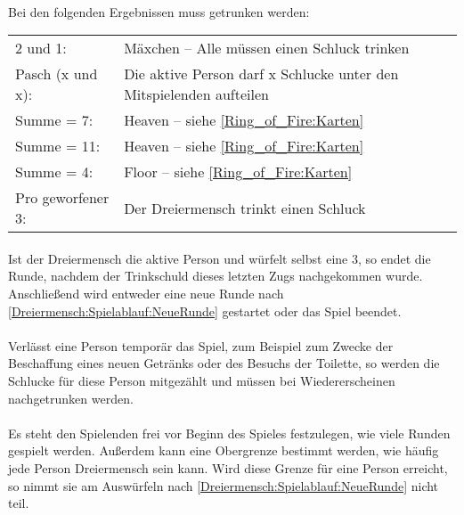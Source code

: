 \paragraph{}
Bei den folgenden Ergebnissen muss getrunken werden:

\begin{tabular}{p{8em} p{22em}}
	2 und 1:          & Mäxchen – Alle müssen einen Schluck trinken                         \\
	Pasch (x und x):  & Die aktive Person darf x Schlucke unter den Mitspielenden aufteilen \\
	Summe = 7:        & Heaven – siehe \ref{Ring_of_Fire:Karten}                            \\
	Summe = 11:       & Heaven – siehe \ref{Ring_of_Fire:Karten}                            \\
	Summe = 4:        & Floor – siehe \ref{Ring_of_Fire:Karten}                             \\
	Pro geworfener 3: & Der Dreiermensch trinkt einen Schluck
\end{tabular}

\paragraph{}
Ist der Dreiermensch die aktive Person und würfelt selbst eine 3, so endet die Runde, nachdem der Trinkschuld dieses letzten Zugs nachgekommen wurde.
Anschließend wird entweder eine neue Runde nach \ref{Dreiermensch:Spielablauf:NeueRunde} gestartet oder das Spiel beendet.

\paragraph{}
Verlässt eine Person temporär das Spiel, zum Beispiel zum Zwecke der Beschaffung eines neuen Getränks oder des Besuchs der Toilette, so werden die Schlucke für diese Person mitgezählt und müssen bei Wiedererscheinen nachgetrunken werden.

\paragraph{}
Es steht den Spielenden frei vor Beginn des Spieles festzulegen, wie viele Runden gespielt werden.
Außerdem kann eine Obergrenze bestimmt werden, wie häufig jede Person Dreiermensch sein kann.
Wird diese Grenze für eine Person erreicht, so nimmt sie am Auswürfeln nach \ref{Dreiermensch:Spielablauf:NeueRunde} nicht teil.
